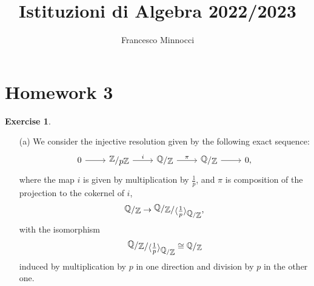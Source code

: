 \documentclass[a4paper]{article}
\title{Istituzioni di Algebra 2022/2023}
\author{Francesco Minnocci}
\newcommand{\Q}{\mathbb{Q}}
\newcommand{\Z}{\mathbb{Z}}
\newcommand{\sfrac}[2]{
    \raisebox{+0.3ex}{$#1$}
    /
    \raisebox{-0.3ex}{$#2$}
}
\newcommand{\ssfrac}[2]{
    \raisebox{+0.3ex}{\scalebox{0.9}{$#1$}}
    /
    \raisebox{-0.3ex}{\scalebox{0.9}{$#2$}}
}
\theoremstyle{definition}
\theoremstyle{definition}
\theoremstyle{remark}
\theoremstyle{definition}
\newtheorem{exercise}{Exercise}[section]
\begin{document}
\maketitle
\section*{Homework 3}
\setcounter{section}{3}
\begin{exercise}
	\begin{itemize}\


		\item[(a)]
We consider the injective resolution given by the following exact sequence:
\begin{equation}\label{eq:seq}
\begin{tikzcd}
	0 \rar & {\sfrac{\Z}{p\Z}} \rar["i"] & {\sfrac{\Q}{\Z}} \rar["\pi"] & {\sfrac{\Q}{\Z}} \rar & 0,
\end{tikzcd}
\end{equation}
where the map $i$ is given by multiplication by $\frac{1}{p}$, and $\pi$ is composition of the projection to the cokernel of $i$,
$$\sfrac{\Q}{\Z}\to\sfrac{\sfrac{\Q}{\Z}}{\langle\frac{1}{p}\rangle_{\ssfrac{\Q}{\Z}}},$$ with
the isomorphism \begin{equation}\label{eq:iso}\sfrac{\sfrac{\Q}{\Z}}{\langle\frac{1}{p}\rangle_{\ssfrac{\Q}{\Z}}}\cong\ssfrac{\Q}{\Z}\end{equation} induced by multiplication by $p$ in one direction and division by $p$ in the other one.


\end{itemize}
\end{exercise}
\end{document}
